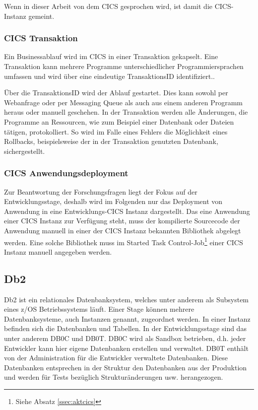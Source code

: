 Wenn in dieser Arbeit von dem CICS gesprochen wird, ist damit die CICS-Instanz  gemeint.

\subsubsection{CICS Transaktion}\label{subsec:trans}
Ein Businessablauf wird im CICS in einer Transaktion gekapselt.
Eine Transaktion kann mehrere Programme unterschiedlicher Programmiersprachen umfassen und wird über eine eindeutige \glqq TransaktionsID\grqq{} identifiziert..

Über die TransaktionsID wird der Ablauf gestartet.
Dies kann sowohl per Webanfrage oder per Messaging Queue als auch aus einem anderen Programm heraus oder manuell geschehen.
In der Transaktion werden alle Änderungen, die Programme an Ressourcen, wie zum Beispiel einer Datenbank oder Dateien tätigen, protokolliert.
So wird im Falle eines Fehlers die Möglichkeit eines Rollbacks, beispielsweise der in der Transaktion genutzten Datenbank, sichergestellt.
 \cite[5-8]{Rayns.2011}

\subsubsection{CICS Anwendungsdeployment}\label{sssec:cicsanwd}
Zur Beantwortung der Forschungsfragen liegt der Fokus auf der Entwicklungsstage, deshalb wird im Folgenden nur das Deployment von Anwendung in eine Entwicklungs-CICS Instanz dargestellt.
Das eine Anwendung einer CICS Instanz zur Verfügung steht, muss der kompilierte Sourcecode der Anwendung manuell in einer der CICS Instanz bekannten Bibliothek abgelegt werden.
Eine solche Bibliothek muss im \glqq Started Task Control-Job\grqq{}\footnote{Siehe Absatz \ref{ssec:aktcics}} einer CICS Instanz manuell angegeben werden.

\subsection{Db2}\label{sssec:db2}
Db2 ist ein relationales Datenbanksystem, welches unter anderem als Subsystem eines z/OS Betriebssystems läuft.
Einer Stage können mehrere Datenbanksysteme, auch Instanzen genannt, zugeordnet werden.
In einer Instanz befinden sich die Datenbanken und Tabellen. 
In der Entwicklungsstage sind das unter anderem \glqq DB0C\grqq{} und \glqq DB0T\grqq.
DB0C wird als Sandbox betrieben, d.h. jeder Entwickler kann hier eigene Datenbanken erstellen und verwaltet.
DB0T enthält von der Administration für die Entwickler verwaltete Datenbanken.
Diese Datenbanken entsprechen in der Struktur den Datenbanken aus der Produktion und werden für Tests bezüglich Strukturänderungen usw. herangezogen.

